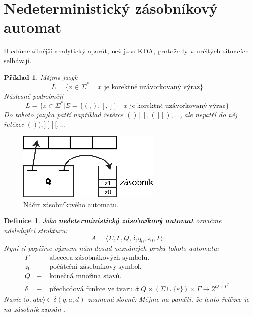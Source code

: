 \documentclass[10pt, a4paper, titlepage]{article}
\theoremstyle{note}
\newtheorem{definice}{\textbf{Definice}}
\newtheorem{priklad}{\textbf{Příklad}}
\begin{document}
\section{Nedeterministický zásobníkový automat}
Hledáme silnější analytický aparát, než jsou KDA, protože ty v určitých situacích selhávají.

\begin{priklad}
Mějme jazyk
$$L = \lbrace x \in \Sigma^{*}| \quad x \text{ je korektně uzávorkovaný výraz} \rbrace$$
Následně podrobněji
$$L = \lbrace x \in \Sigma^{*}| \Sigma = \lbrace (,),[,] \rbrace \quad x \text{ je korektně uzávorkovaný výraz} \rbrace$$
Do tohoto jazyka patří například řetězce $()[], ([]), \ldots$, ale nepatří do něj řetězce $()), ][][, \ldots$
\end{priklad}

\begin{figure}[ht]
\centering\includegraphics[width=7cm]{zasobnikovy.eps}
\caption{Náčrt zásobníkového automatu.}
\end{figure}

\begin{definice}
Jako \textbf{nedeterministický zásobníkový automat} označme následující strukturu:
$$
A = \langle \Sigma, \Gamma, Q, \delta, q_0, z_0, F \rangle
$$
Nyní si popišme význam nám dosud neznámých prvků tohoto automatu:
\begin{eqnarray*}
\Gamma &-& \text{ abeceda zásobnákových symbolů.} \\
z_0 &-& \text{ počáteční zásobníkový symbol.} \\
Q &-& \text{ konečná množina stavů.} \\
\delta &-& \text{ přechodová funkce ve tvaru } \delta : Q \times (\Sigma \cup \lbrace \varepsilon \rbrace) \times \Gamma \rightarrow 2^{Q \times \Gamma^{*}}
\end{eqnarray*}
Navíc $\langle \sigma, abc \rangle \in \delta(q, a, d)$ znamená slovně:  Mějme na paměti, že tento řetězec je na zásobník zapsán .
\end{definice}
\end{document}
